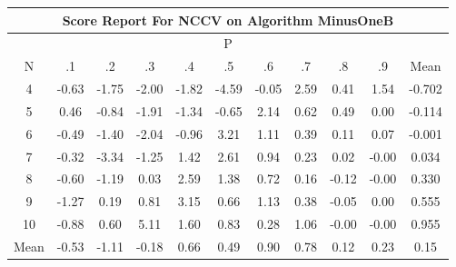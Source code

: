 \documentclass[11pt,a4paper]{report}
\begin{document}
\begin{longtable}{ | c || c | c | c | c | c | c | c | c | c || c |}
\hline
\multicolumn{11}{|c|}{ Score Report For NCCV on Algorithm MinusOneB} \\
\hline
\multicolumn{11}{|c|}{ P } \\
\hline
N & .1 & .2 & .3 & .4 & .5 & .6 & .7 & .8 & .9 & Mean\\
 \hline
 \hline
 \endhead
  4 &  \cellcolor[HTML]{FFEFEF} -0.63 &  \cellcolor[HTML]{FFCFCF} -1.75 &  \cellcolor[HTML]{FFCFCF} -2.00 &  \cellcolor[HTML]{FFCFCF} -1.82 &  \cellcolor[HTML]{FF8F8F} -4.59 &  \cellcolor[HTML]{FFFFFF} -0.05 &  \cellcolor[HTML]{BFBFFF} 2.59 &  \cellcolor[HTML]{F7F7FF} 0.41 &  \cellcolor[HTML]{D7D7FF} 1.54 & -0.702 \\
  5 &  \cellcolor[HTML]{F7F7FF} 0.46 &  \cellcolor[HTML]{FFE7E7} -0.84 &  \cellcolor[HTML]{FFCFCF} -1.91 &  \cellcolor[HTML]{FFDFDF} -1.34 &  \cellcolor[HTML]{FFEFEF} -0.65 &  \cellcolor[HTML]{C7C7FF} 2.14 &  \cellcolor[HTML]{EFEFFF} 0.62 &  \cellcolor[HTML]{EFEFFF} 0.49 &  \cellcolor[HTML]{FFFFFF} 0.00 & -0.114 \\
  6 &  \cellcolor[HTML]{FFEFEF} -0.49 &  \cellcolor[HTML]{FFDFDF} -1.40 &  \cellcolor[HTML]{FFCFCF} -2.04 &  \cellcolor[HTML]{FFE7E7} -0.96 &  \cellcolor[HTML]{AFAFFF} 3.21 &  \cellcolor[HTML]{E7E7FF} 1.11 &  \cellcolor[HTML]{F7F7FF} 0.39 &  \cellcolor[HTML]{FFFFFF} 0.11 &  \cellcolor[HTML]{FFFFFF} 0.07 & -0.001 \\
  7 &  \cellcolor[HTML]{FFF7F7} -0.32 &  \cellcolor[HTML]{FFA7A7} -3.34 &  \cellcolor[HTML]{FFDFDF} -1.25 &  \cellcolor[HTML]{DFDFFF} 1.42 &  \cellcolor[HTML]{BFBFFF} 2.61 &  \cellcolor[HTML]{E7E7FF} 0.94 &  \cellcolor[HTML]{F7F7FF} 0.23 &  \cellcolor[HTML]{FFFFFF} 0.02 &  \cellcolor[HTML]{FFFFFF} -0.00 & 0.034 \\
  8 &  \cellcolor[HTML]{FFEFEF} -0.60 &  \cellcolor[HTML]{FFDFDF} -1.19 &  \cellcolor[HTML]{FFFFFF} 0.03 &  \cellcolor[HTML]{BFBFFF} 2.59 &  \cellcolor[HTML]{DFDFFF} 1.38 &  \cellcolor[HTML]{EFEFFF} 0.72 &  \cellcolor[HTML]{F7F7FF} 0.16 &  \cellcolor[HTML]{FFFFFF} -0.12 &  \cellcolor[HTML]{FFFFFF} -0.00 & 0.330 \\
  9 &  \cellcolor[HTML]{FFDFDF} -1.27 &  \cellcolor[HTML]{F7F7FF} 0.19 &  \cellcolor[HTML]{E7E7FF} 0.81 &  \cellcolor[HTML]{AFAFFF} 3.15 &  \cellcolor[HTML]{EFEFFF} 0.66 &  \cellcolor[HTML]{DFDFFF} 1.13 &  \cellcolor[HTML]{F7F7FF} 0.38 &  \cellcolor[HTML]{FFFFFF} -0.05 &  \cellcolor[HTML]{FFFFFF} 0.00 & 0.555 \\
  10 &  \cellcolor[HTML]{FFE7E7} -0.88 &  \cellcolor[HTML]{EFEFFF} 0.60 &  \cellcolor[HTML]{8080FF} 5.11 &  \cellcolor[HTML]{D7D7FF} 1.60 &  \cellcolor[HTML]{E7E7FF} 0.83 &  \cellcolor[HTML]{F7F7FF} 0.28 &  \cellcolor[HTML]{E7E7FF} 1.06 &  \cellcolor[HTML]{FFFFFF} -0.00 &  \cellcolor[HTML]{FFFFFF} -0.00 & 0.955 \\
 \hline
 \hline
Mean &  \cellcolor[HTML]{FFEFEF} -0.53 &  \cellcolor[HTML]{FFE7E7} -1.11 &  \cellcolor[HTML]{FFF7F7} -0.18 &  \cellcolor[HTML]{EFEFFF} 0.66 &  \cellcolor[HTML]{EFEFFF} 0.49 &  \cellcolor[HTML]{E7E7FF} 0.90 &  \cellcolor[HTML]{EFEFFF} 0.78 &  \cellcolor[HTML]{FFFFFF} 0.12 &  \cellcolor[HTML]{F7F7FF} 0.23 &  \cellcolor[HTML]{FFFFFF} 0.15
\end{longtable}
\end{document}

